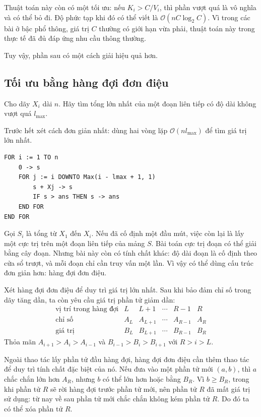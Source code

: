 \documentclass[11pt]{article}
\newcommand{\Oh}{\mathcal{O}}
\begin{document}
Thuật toán này còn có một tối ưu: nếu \(K_i>C/V_i\), thì phần vượt quá là vô
nghĩa và có thể bỏ đi. Độ phức tạp khi đó có thể viết là
\(\Oh(nC\log_2 C)\). Vì trong các bài ở bậc phổ thông, giá trị \(C\) thường
có giới hạn vừa phải, thuật toán này trong thực tế đã đủ đáp ứng nhu cầu
thông thường.

Tuy vậy, phần sau có một cách giải hiệu quả hơn.

\subsection{Tối ưu bằng hàng đợi đơn điệu}

Cho dãy \(X_i\) dài \(n\). Hãy tìm tổng lớn nhất của một đoạn liên tiếp có độ
dài không vượt quá \(l_{\max}\).

Trước hết xét cách đơn giản nhất: dùng hai vòng lặp \(\Oh(nl_{\max})\) để tìm
giá trị lớn nhất.

\begin{verbatim}
FOR i := 1 TO n
    0 -> s
    FOR j := i DOWNTO Max(i - lmax + 1, 1)
        s + Xj -> s
        IF s > ans THEN s -> ans
    END FOR
END FOR
\end{verbatim}

Gọi \(S_i\) là tổng từ \(X_1\) đến \(X_i\). Nếu đã cố định một đầu mút, việc
còn lại là lấy một cực trị trên một đoạn liên tiếp của mảng \(S\). Bài toán
cực trị đoạn có thể giải bằng cây đoạn. Nhưng bài này còn có tính chất khác:
độ dài đoạn là cố định theo cửa sổ trượt, và mỗi đoạn chỉ cần truy vấn một lần.
Vì vậy có thể dùng cấu trúc đơn giản hơn: hàng đợi đơn điệu.

Xét hàng đợi đơn điệu để duy trì giá trị lớn nhất. Sau khi bảo đảm chỉ số trong
dãy tăng dần, ta còn yêu cầu giá trị phần tử giảm dần:
\[
\begin{array}{c|ccccc}
\text{vị trí trong hàng đợi} & L & L+1 & \cdots & R-1 & R\\
\hline
\text{chỉ số} & A_L & A_{L+1} & \cdots & A_{R-1} & A_R\\
\text{giá trị} & B_L & B_{L+1} & \cdots & B_{R-1} & B_R
\end{array}
\]
Thỏa mãn \(A_{i+1}>A_i>A_{i-1}\) và \(B_{i-1}>B_i>B_{i+1}\) với
\(R>i>L\).

Ngoài thao tác lấy phần tử đầu hàng đợi, hàng đợi đơn điệu cần thêm thao tác
để duy trì tính chất đặc biệt của nó. Nếu đưa vào một phần tử mới \((a,b)\),
thì \(a\) chắc chắn lớn hơn \(A_R\), nhưng \(b\) có thể lớn hơn hoặc bằng
\(B_R\). Vì \(b\ge B_R\), trong khi phần tử \(R\) sẽ rời hàng đợi trước phần
tử mới, nên phần tử \(R\) đã mất giá trị sử dụng: từ nay về sau phần tử mới
chắc chắn không kém phần tử \(R\). Do đó ta có thể xóa phần tử \(R\).
\end{document}
